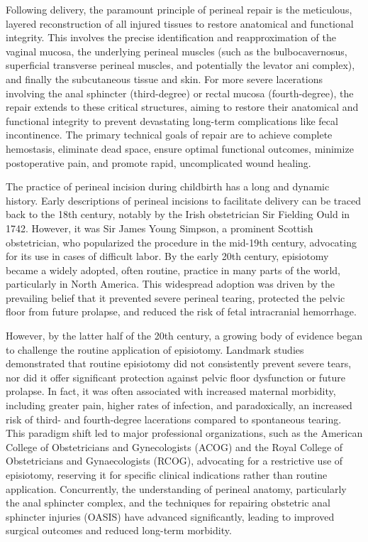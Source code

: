 Following delivery, the paramount principle of perineal repair is the meticulous, layered reconstruction of all injured tissues to restore anatomical and functional integrity. This involves the precise identification and reapproximation of the vaginal mucosa, the underlying perineal muscles (such as the bulbocavernosus, superficial transverse perineal muscles, and potentially the levator ani complex), and finally the subcutaneous tissue and skin. For more severe lacerations involving the anal sphincter (third-degree) or rectal mucosa (fourth-degree), the repair extends to these critical structures, aiming to restore their anatomical and functional integrity to prevent devastating long-term complications like fecal incontinence. The primary technical goals of repair are to achieve complete hemostasis, eliminate dead space, ensure optimal functional outcomes, minimize postoperative pain, and promote rapid, uncomplicated wound healing.

The practice of perineal incision during childbirth has a long and dynamic history. Early descriptions of perineal incisions to facilitate delivery can be traced back to the 18th century, notably by the Irish obstetrician Sir Fielding Ould in 1742. However, it was Sir James Young Simpson, a prominent Scottish obstetrician, who popularized the procedure in the mid-19th century, advocating for its use in cases of difficult labor. By the early 20th century, episiotomy became a widely adopted, often routine, practice in many parts of the world, particularly in North America. This widespread adoption was driven by the prevailing belief that it prevented severe perineal tearing, protected the pelvic floor from future prolapse, and reduced the risk of fetal intracranial hemorrhage.

However, by the latter half of the 20th century, a growing body of evidence began to challenge the routine application of episiotomy. Landmark studies demonstrated that routine episiotomy did not consistently prevent severe tears, nor did it offer significant protection against pelvic floor dysfunction or future prolapse. In fact, it was often associated with increased maternal morbidity, including greater pain, higher rates of infection, and paradoxically, an increased risk of third- and fourth-degree lacerations compared to spontaneous tearing. This paradigm shift led to major professional organizations, such as the American College of Obstetricians and Gynecologists (ACOG) and the Royal College of Obstetricians and Gynaecologists (RCOG), advocating for a restrictive use of episiotomy, reserving it for specific clinical indications rather than routine application. Concurrently, the understanding of perineal anatomy, particularly the anal sphincter complex, and the techniques for repairing obstetric anal sphincter injuries (OASIS) have advanced significantly, leading to improved surgical outcomes and reduced long-term morbidity.

